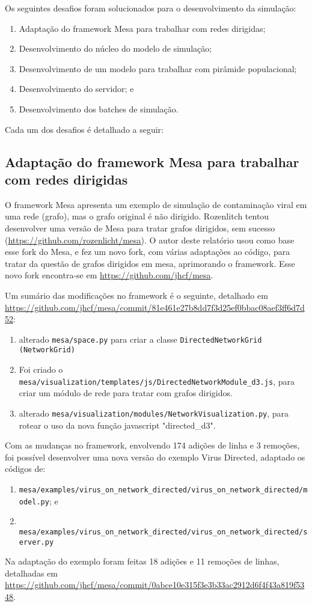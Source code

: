 Os seguintes desafios foram solucionados para o desenvolvimento da simulação:
\begin{enumerate}
    \item Adaptação do framework Mesa para trabalhar com redes dirigidas;
    \item Desenvolvimento do núcleo do modelo de simulação;
    \item Desenvolvimento de um modelo para trabalhar com pirâmide populacional;
    \item Desenvolvimento do servidor; e 
    \item Desenvolvimento dos batches de simulação.
\end{enumerate}

Cada um dos desafios é detalhado a seguir:

\subsection{Adaptação do framework Mesa para trabalhar com redes dirigidas}

O framework Mesa apresenta um exemplo de simulação de contaminação viral em uma rede (grafo), mas o grafo original é não dirigido.
Rozenlitch tentou desenvolver uma versão de Mesa para tratar grafos dirigidos, sem sucesso (\url{https://github.com/rozenlicht/mesa}).
O autor deste relatório usou como base esse fork do Mesa, e fez um novo fork, com várias adaptações ao código, para tratar da questão de grafos dirigidos em mesa, aprimorando o framework. Esse novo fork encontra-se em \url{https://github.com/jhcf/mesa}.

Um sumário das modificações no framework é o seguinte, detalhado em \url{https://github.com/jhcf/mesa/commit/81e461e27b8dd7f3d25ef0bbac08aef3ff6d7d52}:
\begin{enumerate}
    \item  alterado \texttt{mesa/space.py} para criar a classe \texttt{DirectedNetworkGrid (NetworkGrid)}
\item Foi criado o \texttt{mesa/visualization/templates/js/DirectedNetworkModule\_d3.js}, para criar um módulo de rede para tratar com grafos dirigidos.
\item alterado \texttt{mesa/visualization/modules/NetworkVisualization.py}, para rotear o uso da nova função javascript "directed\_d3".
\end{enumerate}

Com as mudanças no framework, envolvendo 174 adições de linha e 3 remoções, foi possível desenvolver uma nova versão do exemplo Virus Directed, adaptado os códigos de:
\begin{enumerate}
\item \texttt{mesa/examples/virus\_on\_network\_directed/virus\_on\_network\_directed/model.py}; e
\item \texttt{
	mesa/examples/virus\_on\_network\_directed/virus\_on\_network\_directed/server.py
}
\end{enumerate}
Na adaptação do exemplo foram feitas 18 adições e 11 remoções de linhas, detalhadas em  \url{https://github.com/jhcf/mesa/commit/0abce10e315f3e3b33ac2912d6f4f43a819f5348}.

